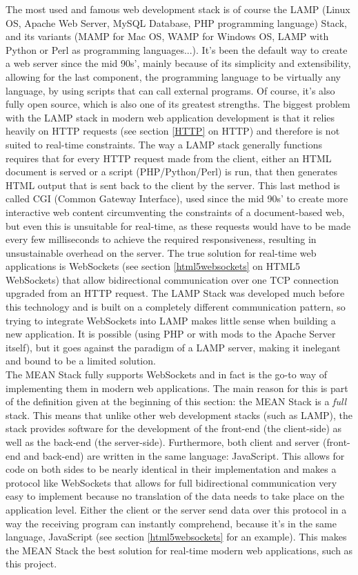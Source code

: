 The most used and famous web development stack is of course the LAMP (Linux OS, Apache Web Server, MySQL Database, PHP
programming language) Stack, and its variants (MAMP for Mac OS, WAMP for Windows OS, LAMP with Python or Perl as programming
languages...). It's been the default way to create a web server since the mid 90s', mainly because of its simplicity and
extensibility, allowing for the last component, the programming language to be virtually any language, by using scripts that
can call external programs. Of course, it's also fully open source, which is also one of its greatest strengths. The biggest
problem with the LAMP stack in modern web application development is that it relies heavily on HTTP requests (see section \ref{HTTP} on HTTP) and therefore is not suited to real-time constraints. The way a LAMP stack generally functions requires that
for every HTTP request made from the client, either an HTML document is served or a script (PHP/Python/Perl) is run, that then
generates HTML output that is sent back to the client by the server. This last method is called CGI (Common Gateway
Interface), used since the mid 90s' to create more interactive web content circumventing the constraints of a document-based
web, but even this is unsuitable for real-time, as these requests would have to be made every few milliseconds to achieve the
required responsiveness, resulting in unsustainable overhead on the server. The true solution for real-time web applications
is WebSockets (see section \ref{html5websockets} on HTML5 WebSockets) that allow bidirectional communication over one TCP
connection upgraded from an HTTP request. The LAMP Stack was developed much before this technology and is built on a
completely different communication pattern, so trying to integrate WebSockets into LAMP makes little sense when building a new
application. It is possible (using PHP or with mods to the Apache Server itself), but it goes against the paradigm of a LAMP
server, making it inelegant and bound to be a limited solution.\\

The MEAN Stack fully supports WebSockets and in fact is the go-to way of implementing them in modern web applications. The
main reason for this is part of the definition given at the beginning of this section: the MEAN Stack is a \textit{full}
stack. This means that unlike other web development stacks (such as LAMP), the stack provides software for the development of
the front-end (the client-side) as well as the back-end (the server-side). Furthermore, both client and server (front-end and
back-end) are written in the same language: JavaScript. This allows for code on both sides to be nearly identical in their
implementation and makes a protocol like WebSockets that allows for full bidirectional communication very easy to implement
because no translation of the data needs to take place on the application level. Either the client or the server send data
over this protocol in a way the receiving program can instantly comprehend, because it's in the same language, JavaScript  
(see section \ref{html5websockets} for an example). This makes the MEAN Stack the best solution for real-time modern web
applications, such as this project.\\


